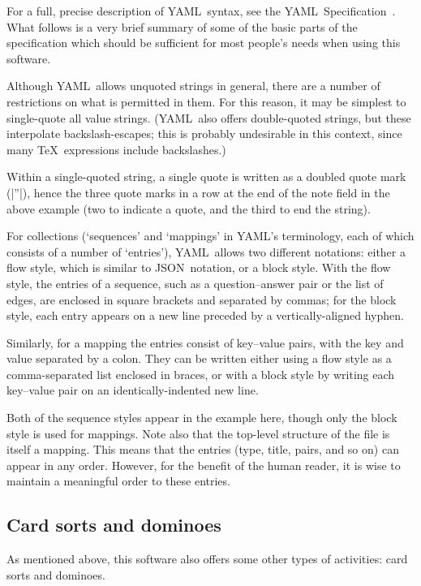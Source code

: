 \documentclass{article}
\def\YAML{{\small YAML}}
\def\JSON{{\small JSON}}
\begin{document}
For a full, precise description of \YAML\ syntax, see the \YAML\
Specification~\cite{YAML}.  What follows is a very brief summary of
some of the basic parts of the specification which should be
sufficient for most people's needs when using this software.

Although \YAML\ allows unquoted strings in general, there are a number
of restrictions on what is permitted in them.  For this reason, it may
be simplest to single-quote all value strings.  (\YAML\ also offers
double-quoted strings, but these interpolate backslash-escapes; this
is probably undesirable in this context, since many \TeX\ expressions
include backslashes.)

Within a single-quoted string, a single quote is written as a doubled
quote mark (|''|), hence the three quote marks in a row at the
end of the note field in the above example (two to indicate a quote,
and the third to end the string).

For collections (`sequences' and `mappings' in \YAML's terminology,
each of which consists of a number of `entries'), \YAML\ allows two
different notations: either a flow style, which is similar to \JSON\
notation, or a block style.  With the flow style, the entries of a
sequence, such as a question--answer pair or the list of edges,
are enclosed in square brackets and separated by commas; for the block
style, each entry appears on a new line preceded by a
vertically-aligned hyphen.

Similarly, for a mapping the entries
consist of key--value pairs, with the key and value separated by a
colon.  They can be written either using a flow style as a
comma-separated list enclosed in braces, or with a block style by
writing each key--value pair on an identically-indented new line.

Both of the sequence styles appear in the example here, though only
the block style is used for mappings.  Note also that the top-level
structure of the file is itself a mapping.  This means that the
entries (type, title, pairs, and so on) can appear in any order.
However, for the benefit of the human reader, it is wise to maintain a
meaningful order to these entries.

\subsection{Card sorts and dominoes}

As mentioned above, this software also offers some other types of
activities: card sorts and dominoes.
\end{document}
